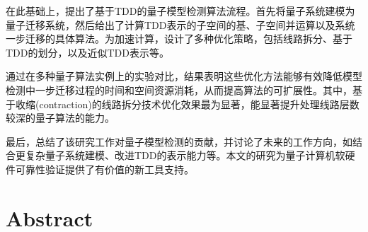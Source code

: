 在此基础上，提出了基于TDD的量子模型检测算法流程。首先将量子系统建模为量子迁移系统，然后给出了计算TDD表示的子空间的基、子空间并运算以及系统一步迁移的具体算法。为加速计算，设计了多种优化策略，包括线路拆分、基于TDD的划分，以及近似TDD表示等。

通过在多种量子算法实例上的实验对比，结果表明这些优化方法能够有效降低模型检测中一步迁移过程的时间和空间资源消耗，从而提高算法的可扩展性。其中，基于收缩(contraction)的线路拆分技术优化效果最为显著，能显著提升处理线路层数较深的量子算法的能力。

最后，总结了该研究工作对量子模型检测的贡献，并讨论了未来的工作方向，如结合更复杂量子系统建模、改进TDD的表示能力等。本文的研究为量子计算机软硬件可靠性验证提供了有价值的新工具支持。

\intobmk\chapter*{Abstract}%



